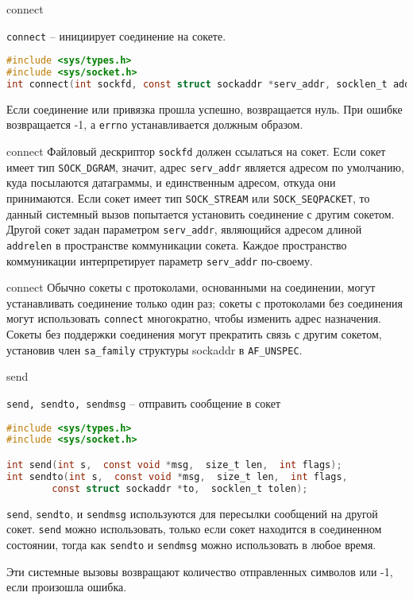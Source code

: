 \begin{frame}[fragile]{connect}

{\tt connect} -- инициирует соединение на сокете.

\scriptsize\begin{lstlisting}[language=C]
#include <sys/types.h> 
#include <sys/socket.h> 
int connect(int sockfd, const struct sockaddr *serv_addr, socklen_t addrlen); 
\end{lstlisting}

Если соединение или привязка прошла успешно, возвращается нуль. 
При ошибке возвращается -1, а {\tt errno} устанавливается должным образом.
\end{frame}

\begin{frame}{connect}
Файловый дескриптор {\tt sockfd} должен ссылаться на сокет. 
Если сокет имеет тип {\tt SOCK\_DGRAM}, значит, адрес {\tt serv\_addr} является 
адресом по умолчанию, куда посылаются датаграммы, и единственным адресом, откуда 
они принимаются. Если сокет имеет тип {\tt SOCK\_STREAM} или {\tt SOCK\_SEQPACKET},
то данный системный вызов попытается установить соединение с другим сокетом.
Другой сокет задан параметром {\tt serv\_addr}, являющийся адресом длиной 
{\tt addrelen} в пространстве коммуникации сокета. Каждое пространство коммуникации 
интерпретирует параметр {\tt serv\_addr} по-своему.
\end{frame}

\begin{frame}{connect}
Обычно сокеты с протоколами, основанными на соединении, могут устанавливать 
соединение только один раз; сокеты с протоколами без соединения могут 
использовать {\tt connect} многократно, чтобы изменить адрес назначения. 
Сокеты без поддержки соединения могут прекратить связь с другим сокетом, 
установив член {\tt sa\_family} структуры sockaddr в {\tt AF\_UNSPEC}.
\end{frame}


\begin{frame}[fragile]{send}

{\tt send, sendto, sendmsg} -- отправить сообщение в сокет 
\scriptsize\begin{lstlisting}[language=C]
#include <sys/types.h>
#include <sys/socket.h>

int send(int s,  const void *msg,  size_t len,  int flags);
int sendto(int s,  const void *msg,  size_t len,  int flags,
		const struct sockaddr *to,  socklen_t tolen);
\end{lstlisting}
{\tt send}, {\tt sendto},  и {\tt sendmsg} используются для пересылки сообщений  на  другой  сокет. {\tt send}  можно использовать,   только если сокет находится в соединенном состоянии,  тогда как {\tt sendto} и {\tt sendmsg} можно использовать в любое время.

Эти системные вызовы возвращают  количество  отправленных  символов  или  -1, если  произошла ошибка.
\end{frame}

